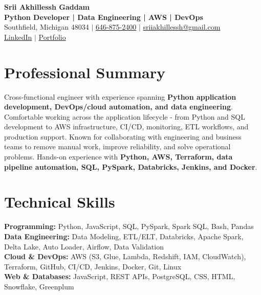 \documentclass[letterpaper,10pt]{article}
\begin{document}
\fontsize{9.35pt}{10.45pt}\selectfont

\begin{center}
    {\LARGE \textbf{Srii Akhillessh Gaddam}} \\[-1pt]
    \textbf{Python Developer | Data Engineering | AWS | DevOps} \\[2pt]
    Southfield, Michigan 48034 $|$
    \href{tel:6468752400}{646-875-2400} $|$
    \href{mailto:sriiakhillessh@gmail.com}{sriiakhillessh@gmail.com} \\[1pt]
    \href{https://www.linkedin.com/in/srii-akhiilessh-gaddam-b48668191/}{LinkedIn} $|$
    \href{https://sriiakhillesshg.github.io/portfolio/}{Portfolio}
\end{center}
\vspace{-8pt}

\section{Professional Summary}
\small{Cross-functional engineer with experience spanning \textbf{Python application development, DevOps/cloud automation, and data engineering}. Comfortable working across the application lifecycle - from Python and SQL development to AWS infrastructure, CI/CD, monitoring, ETL workflows, and production support. Known for collaborating with engineering and business teams to remove manual work, improve reliability, and solve operational problems. Hands-on experience with \textbf{Python, AWS, Terraform, data pipeline automation, SQL, PySpark, Databricks, Jenkins, and Docker}.}

\section{Technical Skills}
\small{
\textbf{Programming:} Python, JavaScript, SQL, PySpark, Spark SQL, Bash, Pandas \\
\textbf{Data Engineering:} Data Modeling, ETL/ELT, Databricks, Apache Spark, Delta Lake, Auto Loader, Airflow, Data Validation \\
\textbf{Cloud \& DevOps:} AWS (S3, Glue, Lambda, Redshift, IAM, CloudWatch), Terraform, GitHub, CI/CD, Jenkins, Docker, Git, Linux \\
\textbf{Web \& Databases:} JavaScript, REST APIs, PostgreSQL, CSS, HTML, Snowflake, Greenplum
}
\end{document}
